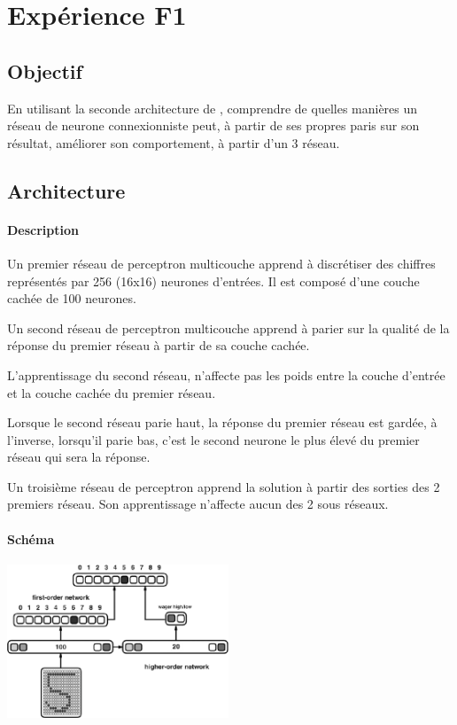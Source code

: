\section{Expérience F1} 
  \subsection{Objectif}
    En utilisant la seconde architecture de \cite{Cleeremans_2007}, 
    comprendre de quelles manières un réseau de neurone connexionniste peut, à partir de ses propres paris
    sur son résultat, améliorer son comportement, à partir d'un 3 réseau.
  
  
     
  \subsection{Architecture}
    \paragraph{Description}
      Un premier réseau de perceptron multicouche apprend à discrétiser des chiffres représentés
      par 256 (16x16) neurones d'entrées. Il est composé d'une couche cachée de 100 neurones.
      
      Un second réseau de perceptron multicouche apprend à parier sur la qualité de la réponse
      du premier réseau à partir de sa couche cachée.
      
      L'apprentissage du second réseau, n'affecte pas les poids entre la couche d'entrée et la 
      couche cachée du premier réseau.
      
      Lorsque le second réseau parie haut, la réponse du premier réseau est gardée, à l'inverse,
      lorsqu'il parie bas, c'est le second neurone le plus élevé du premier réseau qui sera 
      la réponse.
      
      Un troisième réseau de perceptron apprend la solution à partir des sorties des 2 premiers 
      réseau. Son apprentissage n'affecte aucun des 2 sous réseaux.


    \paragraph{Schéma}
      \begin{center}
	\includegraphics[width=250px]{data/expF1/schema.png}
      \end{center}
      

